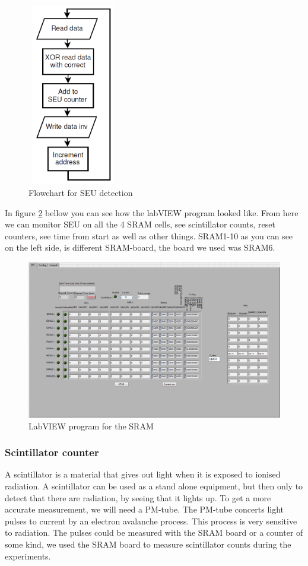 \documentclass[12pt]{article}
\numberwithin{figure}{section}
\begin{document}
\begin{figure}[!htbp]
  \centering
  \includegraphics[height=8cm, width=4cm]{SRAM_flowchart.png}
  \caption{Flowchart for SEU detection}
  \label{flowchart}
\end{figure}

In figure \ref{labview_SRAM} bellow you can see how the labVIEW program looked like. From here we can monitor SEU on all the 4 \ac{SRAM} cells, see scintillator counts, reset counters, see time from start as well as other things. \ac{SRAM}1-10 as you can see on the left side, is different \ac{SRAM}-board, the board we used was SRAM6.

\begin{figure}[!htbp]
  \centering
  \includegraphics[width=\textwidth]{SRAM_labview.png}
  \caption{LabVIEW program for the \ac{SRAM}}
  \label{labview_SRAM}
\end{figure}

\FloatBarrier

\subsubsection{Scintillator counter}
A scintillator is a material that gives out light when it is exposed to ionised radiation. 
A scintillator can be used as a stand alone equipment, but then only to detect that there are radiation, by seeing that it lights up.
To get a more accurate measurement, we will need a \acf{PM-tube}. The PM-tube concerts light pulses to current by an electron avalanche process. This process is very sensitive to radiation.\cite{rad_phys}
The pulses could be measured with the \ac{SRAM} board or a counter of some kind, we used the SRAM board to measure scintillator counts during the experiments.
\end{document}
